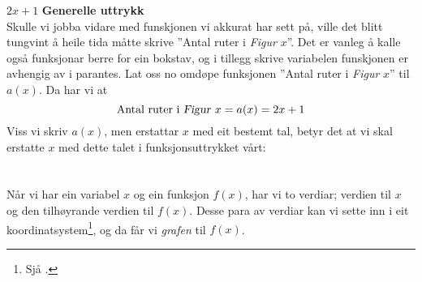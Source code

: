 \st{$ {2x+1} $}
\newpage
\textbf{Generelle uttrykk} \\
Skulle vi jobba vidare med funskjonen vi akkurat har sett på, ville det blitt tungvint å heile tida måtte skrive ''Antal ruter i \textsl{Figur }$ x $''. Det er vanleg å kalle også funksjonar berre for ein bokstav, og i tillegg skrive variabelen funskjonen er avhengig av i parantes. Lat oss no omdøpe funksjonen ''Antal ruter i \textsl{Figur} $ x $'' til $ a(x) $. Da har vi at
\[ \text{Antal ruter i \textsl{Figur }}x=a(x)=2x+1 \]
Viss vi skriv $ a(x) $, men erstattar $ x $ med eit bestemt tal, betyr det at vi skal erstatte $ x $ med dette talet i funksjonsuttrykket vårt:
\newpage
{}
\section{\lingraf}
Når vi har ein variabel $ x $ og ein funksjon $ f(x)  $, har vi to verdiar; verdien til $ x $ og den tilhøyrande verdien til $ f(x) $. Desse para av verdiar kan vi sette inn i eit koordinatsystem\footnote{Sjå .}, og da får vi \textit{grafen} til $ f(x) $. \vsk

